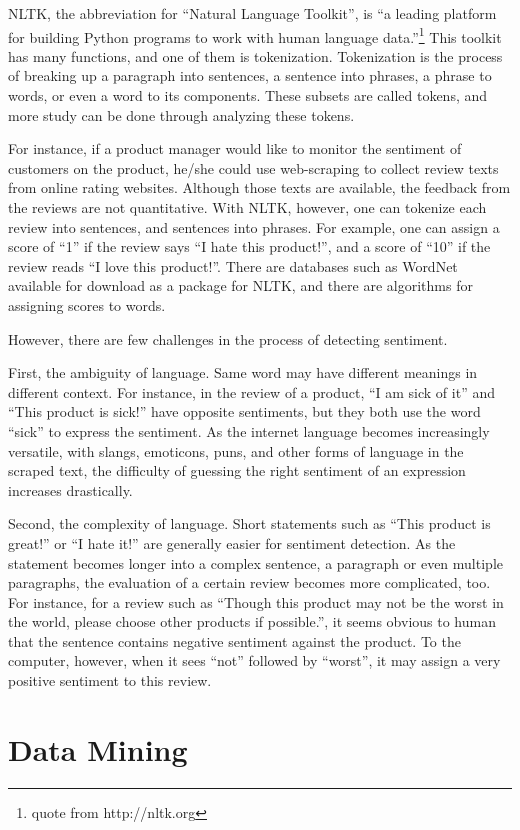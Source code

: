 \documentclass[12pt]{report}
\begin{document}
NLTK, the abbreviation for ``Natural Language Toolkit'', is ``a leading platform for building Python programs to work with human language data.''\footnote{quote from http://nltk.org} This toolkit has many functions, and one of them is tokenization. Tokenization is the process of breaking up a paragraph into sentences, a sentence into phrases, a phrase to words, or even a word to its components. These subsets are called tokens, and more study can be done through analyzing these tokens.

For instance, if a product manager would like to monitor the sentiment of customers on the product, he/she could use web-scraping to collect review texts from online rating websites. Although those texts are available, the feedback from the reviews are not quantitative. With NLTK, however, one can tokenize each review into sentences, and sentences into phrases. For example, one can assign a score of ``1'' if the review says ``I hate this product!'', and a score of ``10'' if the review reads ``I love this product!''. There are databases such as WordNet available for download as a package for NLTK, and there are algorithms for assigning scores to words.

However, there are few challenges in the process of detecting sentiment. 

First, the ambiguity of language. Same word may have different meanings in different context. For instance, in the review of a product, ``I am sick of it'' and ``This product is sick!'' have opposite sentiments, but they both use the word ``sick'' to express the sentiment. As the internet language becomes increasingly versatile, with slangs, emoticons, puns, and other forms of language in the scraped text, the difficulty of guessing the right sentiment of an expression increases drastically.

Second, the complexity of language. Short statements such as ``This product is great!'' or ``I hate it!'' are generally easier for sentiment detection. As the statement becomes longer into a complex sentence, a paragraph or even multiple paragraphs, the evaluation of a certain review becomes more complicated, too. For instance, for a review such as ``Though this product may not be the worst in the world, please choose other products if possible.'', it seems obvious to human that the sentence contains negative sentiment against the product. To the computer, however, when it sees ``not'' followed by ``worst'', it may assign a very positive sentiment to this review.

\section{Data Mining}
\end{document}
